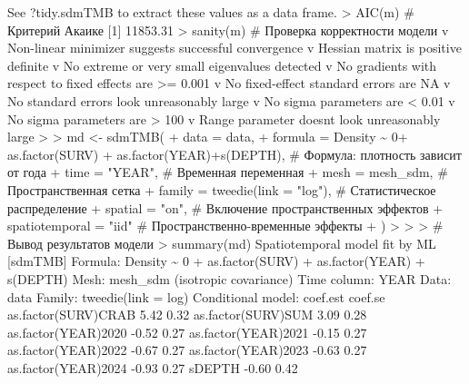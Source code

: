 \documentclass[
  letterpaper,
  DIV=11,
  numbers=noendperiod]{scrreprt}
\newenvironment{Shaded}{\begin{snugshade}}{\end{snugshade}}
\newcommand{\CommentTok}[1]{\textcolor[rgb]{0.37,0.37,0.37}{#1}}
\newcommand{\ConstantTok}[1]{\textcolor[rgb]{0.56,0.35,0.01}{#1}}
\newcommand{\DecValTok}[1]{\textcolor[rgb]{0.68,0.00,0.00}{#1}}
\newcommand{\FloatTok}[1]{\textcolor[rgb]{0.68,0.00,0.00}{#1}}
\newcommand{\FunctionTok}[1]{\textcolor[rgb]{0.28,0.35,0.67}{#1}}
\newcommand{\NormalTok}[1]{\textcolor[rgb]{0.00,0.23,0.31}{#1}}
\newcommand{\SpecialCharTok}[1]{\textcolor[rgb]{0.37,0.37,0.37}{#1}}
\newcommand{\StringTok}[1]{\textcolor[rgb]{0.13,0.47,0.30}{#1}}
\begin{document}
\begin{Shaded}
\begin{Highlighting}[]
\NormalTok{See ?tidy.sdmTMB to extract these values as a data frame.}
\SpecialCharTok{\textgreater{}} \FunctionTok{AIC}\NormalTok{(m)  }\CommentTok{\# Критерий Акаике}
\NormalTok{[}\DecValTok{1}\NormalTok{] }\FloatTok{11853.31}
\SpecialCharTok{\textgreater{}} \FunctionTok{sanity}\NormalTok{(m)  }\CommentTok{\# Проверка корректности модели}
\NormalTok{v Non}\SpecialCharTok{{-}}\NormalTok{linear minimizer suggests successful convergence}
\NormalTok{v Hessian matrix is positive definite}
\NormalTok{v No extreme or very small eigenvalues detected}
\NormalTok{v No gradients with respect to fixed effects are }\SpecialCharTok{\textgreater{}=} \FloatTok{0.001}
\NormalTok{v No fixed}\SpecialCharTok{{-}}\NormalTok{effect standard errors are }\ConstantTok{NA}
\NormalTok{v No standard errors look unreasonably large}
\NormalTok{v No sigma parameters are }\SpecialCharTok{\textless{}} \FloatTok{0.01}
\NormalTok{v No sigma parameters are }\SpecialCharTok{\textgreater{}} \DecValTok{100}
\NormalTok{v Range parameter doesn}\StringTok{\textquotesingle{}t look unreasonably large}
\StringTok{\textgreater{} }
\StringTok{\textgreater{} md \textless{}{-} sdmTMB(}
\StringTok{+   data = data, }
\StringTok{+   formula = Density \textasciitilde{} 0+ as.factor(SURV) + as.factor(YEAR)+s(DEPTH),  \# Формула: плотность зависит от года}
\StringTok{+   time = "YEAR",         \# Временная переменная}
\StringTok{+   mesh = mesh\_sdm,       \# Пространственная сетка}
\StringTok{+   family = tweedie(link = "log"),  \# Статистическое распределение}
\StringTok{+   spatial = "on",        \# Включение пространственных эффектов}
\StringTok{+   spatiotemporal = "iid" \# Пространственно{-}временные эффекты}
\StringTok{+ )}
\StringTok{\textgreater{} }
\StringTok{\textgreater{} }
\StringTok{\textgreater{} \# Вывод результатов модели}
\StringTok{\textgreater{} summary(md)}
\StringTok{Spatiotemporal model fit by ML [\textquotesingle{}}\NormalTok{sdmTMB}\StringTok{\textquotesingle{}]}
\StringTok{Formula: Density \textasciitilde{} 0 + as.factor(SURV) + as.factor(YEAR) + s(DEPTH)}
\StringTok{Mesh: mesh\_sdm (isotropic covariance)}
\StringTok{Time column: YEAR}
\StringTok{Data: data}
\StringTok{Family: tweedie(link = \textquotesingle{}}\NormalTok{log}\StringTok{\textquotesingle{})}
\StringTok{ }
\StringTok{Conditional model:}
\StringTok{                    coef.est coef.se}
\StringTok{as.factor(SURV)CRAB     5.42    0.32}
\StringTok{as.factor(SURV)SUM      3.09    0.28}
\StringTok{as.factor(YEAR)2020    {-}0.52    0.27}
\StringTok{as.factor(YEAR)2021    {-}0.15    0.27}
\StringTok{as.factor(YEAR)2022    {-}0.67    0.27}
\StringTok{as.factor(YEAR)2023    {-}0.63    0.27}
\StringTok{as.factor(YEAR)2024    {-}0.93    0.27}
\StringTok{sDEPTH                 {-}0.60    0.42}


\end{Highlighting}
\end{Shaded}
\end{document}
